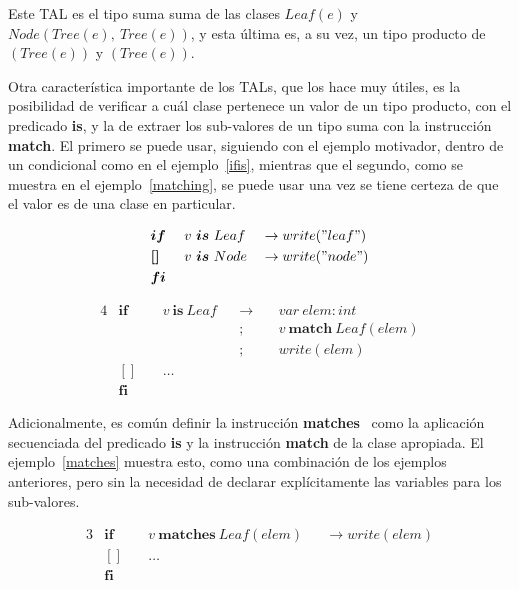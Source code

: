 Este TAL es el tipo suma suma de las clases
$Leaf(e)$ y $Node(Tree(e),\ Tree(e))$,
y esta última es, a su vez, un tipo producto de $(Tree(e))$ y $(Tree(e))$.

Otra característica importante de los TALs, que los hace muy útiles, es la
posibilidad de verificar a cuál clase pertenece un valor de un tipo producto,
con el predicado \textbf{is}, y la de extraer los sub-valores de un tipo suma
con la instrucción \textbf{match}. El primero se puede usar, siguiendo con el
ejemplo motivador, dentro de un condicional como en el ejemplo~\ref{ifis},
mientras que el segundo, como se muestra en el ejemplo~\ref{matching}, se puede
usar una vez se tiene certeza de que el valor es de una clase en particular.

\begin{alignat}{3}
&\boldsymbol{if}\ && v\ \boldsymbol{is}\ Leaf && \rightarrow write("leaf") \nonumber \\
&\boldsymbol{[]}\ && v\ \boldsymbol{is}\ Node && \rightarrow write("node") \label{ifis} \\
&\boldsymbol{fi} \nonumber
\end{alignat}

\begin{alignat}{4}
&\boldsymbol{if}\ && v\ \boldsymbol{is}\ Leaf && \rightarrow &&\ var\ elem : int                   \nonumber \\
&                 &&                          &&           ; &&\ v\ \boldsymbol{match}\ Leaf(elem) \nonumber \\
&                 &&                          &&           ; &&\ write (elem)                      \label{matching} \\
&\boldsymbol{[]}\ && \ldots                                                                        \nonumber \\
&\boldsymbol{fi}                                                                                   \nonumber
\end{alignat}

Adicionalmente, es común definir la instrucción \textbf{matches}~\cite{ravelo}
como la aplicación secuenciada del predicado \textbf{is} y la instrucción
\textbf{match} de la clase apropiada. El ejemplo~\ref{matches} muestra esto,
como una combinación de los ejemplos anteriores, pero sin la necesidad de
declarar explícitamente las variables para los sub-valores.

\begin{alignat}{3}
&\boldsymbol{if}\ && v\ \boldsymbol{matches}\ Leaf(elem)         && \rightarrow write(elem) \nonumber \\
&\boldsymbol{[]}\ && \ldots                                                        \label{matches} \\
&\boldsymbol{fi} \nonumber
\end{alignat}

